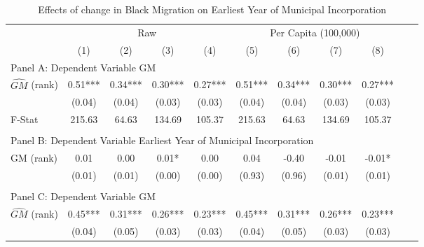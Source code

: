  \begin{table}[htbp]\centering {} \begin{threeparttable} \caption{Effects of change in Black Migration on Earliest Year of Municipal Incorporation} \begin{tabular}{l*{10}{c}} \toprule
                &\multicolumn{4}{c}{Raw}                                    &\multicolumn{4}{c}{Per Capita (100,000)}                   \\\cmidrule(lr){2-5}\cmidrule(lr){6-9}
                &\multicolumn{1}{c}{(1)}   &\multicolumn{1}{c}{(2)}   &\multicolumn{1}{c}{(3)}   &\multicolumn{1}{c}{(4)}   &\multicolumn{1}{c}{(5)}   &\multicolumn{1}{c}{(6)}   &\multicolumn{1}{c}{(7)}   &\multicolumn{1}{c}{(8)}   \\
\cmidrule(lr){1-9}
\multicolumn{8}{l}{Panel A: Dependent Variable GM}\\
\cmidrule(lr){1-9}
$\hat{GM}$ (rank)&       0.51***&       0.34***&       0.30***&       0.27***&       0.51***&       0.34***&       0.30***&       0.27***\\
                &     (0.04)   &     (0.04)   &     (0.03)   &     (0.03)   &     (0.04)   &     (0.04)   &     (0.03)   &     (0.03)   \\
\midrule
F-Stat          &     215.63   &      64.63   &     134.69   &     105.37   &     215.63   &      64.63   &     134.69   &     105.37   \\
\cmidrule[\heavyrulewidth](lr){1-9} \\ \cmidrule[\heavyrulewidth](lr){1-9}
\multicolumn{8}{l}{Panel B: Dependent Variable Earliest Year of Municipal Incorporation}\\
\cmidrule(lr){1-9}
GM  (rank)      &       0.01   &       0.00   &       0.01*  &       0.00   &       0.04   &      -0.40   &      -0.01   &      -0.01*  \\
                &     (0.01)   &     (0.01)   &     (0.00)   &     (0.00)   &     (0.93)   &     (0.96)   &     (0.01)   &     (0.01)   \\
\cmidrule[\heavyrulewidth](lr){1-9} \\ \cmidrule[\heavyrulewidth](lr){1-9}
\multicolumn{8}{l}{Panel C: Dependent Variable GM}\\
\cmidrule(lr){1-9}
$\hat{GM}$ (rank)&       0.45***&       0.31***&       0.26***&       0.23***&       0.45***&       0.31***&       0.26***&       0.23***\\
                &     (0.04)   &     (0.05)   &     (0.03)   &     (0.03)   &     (0.04)   &     (0.05)   &     (0.03)   &     (0.03)   \\

\end{tabular}
\end{threeparttable}
\end{table}
